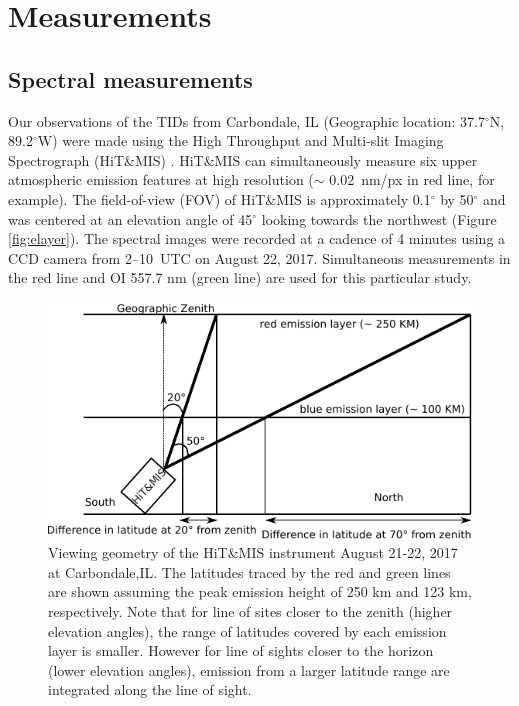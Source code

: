 \documentclass[crop=false,class=mitthesis,oneside,font=12pt]{standalone}
\begin{document}
\section{Measurements}

\subsection{Spectral measurements}

Our observations of the TIDs from Carbondale, IL (Geographic location: 37.7$^\circ$N, 89.2$^\circ$W)  were made using the High Throughput and Multi-slit Imaging Spectrograph (HiT\&MIS) \citep{hitmis}. HiT\&MIS can simultaneously measure six upper atmospheric emission features at high resolution ($\sim$ 0.02~nm/px in red line, for example). The field-of-view (FOV) of HiT\&MIS is approximately 0.1$^\circ$ by 50$^\circ$ and was centered at an elevation angle of 45$^\circ$ looking towards the northwest (Figure \ref{fig:elayer}). The spectral images were recorded at a cadence of 4 minutes using a CCD camera from 2--10~UTC on August 22, 2017. Simultaneous measurements in the red line and OI 557.7 nm (green line) are used for this particular study. 

\begin{figure}[H]
	\centering\includegraphics[width=30pc]{elayer.pdf}
	\caption{Viewing geometry of the HiT\&MIS instrument August 21-22, 2017 at Carbondale,IL. The latitudes traced by the red and green lines are shown assuming the peak emission height of 250 km and 123 km, respectively. Note that for line of sites closer to the zenith (higher elevation angles), the range of latitudes covered by each emission layer is smaller. However for line of sights closer to the horizon (lower elevation angles), emission from a larger latitude range are integrated along the line of sight.}
	\label{fig:elayer1}
\end{figure}
\end{document}
